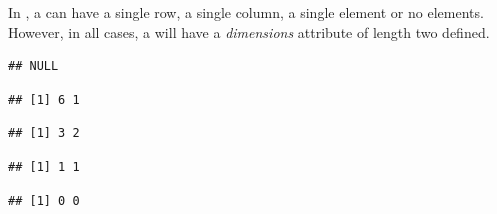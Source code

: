 \documentclass[krantz2]{krantz}\usepackage{knitr}
\begin{document}
\begin{explainbox}
In \Rlang, a  can have a single row, a single column, a single element or no elements. However, in all cases, a  will have a \emph{dimensions} attribute of length two defined.

\begin{knitrout}\footnotesize
{}\color{fgcolor}\begin{kframe}
\begin{alltt}
 \hlkwb{<-} \hlopt{:}
\end{alltt}
\begin{verbatim}
## NULL
\end{verbatim}
\end{kframe}
\end{knitrout}

\begin{knitrout}\footnotesize
{}\color{fgcolor}\begin{kframe}
\begin{alltt}
 \hlkwb{<-} \hlstd{(}\hlopt{:}\hlstd{,}  \hlstd{=} \hlstd{)}
\end{alltt}
\begin{verbatim}
## [1] 6 1
\end{verbatim}
\begin{alltt}
 \hlkwb{<-} \hlstd{(}\hlopt{:}\hlstd{,}  \hlstd{=} \hlstd{)}
\end{alltt}
\begin{verbatim}
## [1] 3 2
\end{verbatim}
\begin{alltt}
 \hlkwb{<-} \hlstd{(}\hlstd{,}  \hlstd{=} \hlstd{)}
\end{alltt}
\begin{verbatim}
## [1] 1 1
\end{verbatim}
\begin{alltt}
 \hlkwb{<-} \hlstd{(}\hlstd{(),}  \hlstd{=} \hlstd{)}
\end{alltt}
\begin{verbatim}
## [1] 0 0
\end{verbatim}
\end{kframe}
\end{knitrout}

\end{explainbox}
\end{document}
